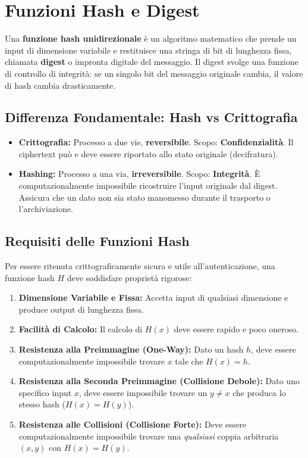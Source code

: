 \section{Funzioni Hash e Digest}
Una \textbf{funzione hash unidirezionale} è un algoritmo matematico che prende un input di dimensione variabile e restituisce una stringa di bit di lunghezza fissa, chiamata \textbf{digest} o impronta digitale del messaggio. 
Il digest svolge una funzione di controllo di integrità: se un singolo bit del messaggio originale cambia, il valore di hash cambia drasticamente.

\subsection{Differenza Fondamentale: Hash vs Crittografia}
\begin{notebox}
\begin{itemize}
    \item \textbf{Crittografia:} Processo a due vie, \textbf{reversibile}. Scopo: \textbf{Confidenzialità}. Il ciphertext può e deve essere riportato allo stato originale (decifratura).
    \item \textbf{Hashing:} Processo a una via, \textbf{irreversibile}. Scopo: \textbf{Integrità}. È computazionalmente impossibile ricostruire l'input originale dal digest. Assicura che un dato non sia stato manomesso durante il trasporto o l'archiviazione.
\end{itemize}
\end{notebox}

\subsection{Requisiti delle Funzioni Hash}
Per essere ritenuta crittograficamente sicura e utile all'autenticazione, una funzione hash $H$ deve soddisfare proprietà rigorose:
\begin{enumerate}
    \item \textbf{Dimensione Variabile e Fissa:} Accetta input di qualsiasi dimensione e produce output di lunghezza fissa.
    \item \textbf{Facilità di Calcolo:} Il calcolo di $H(x)$ deve essere rapido e poco oneroso.
    \item \textbf{Resistenza alla Preimmagine (One-Way):} Dato un hash $h$, deve essere computazionalmente impossibile trovare $x$ tale che $H(x) = h$.
    \item \textbf{Resistenza alla Seconda Preimmagine (Collisione Debole):} Dato uno specifico input $x$, deve essere impossibile trovare un $y \neq x$ che produca lo stesso hash ($H(x) = H(y)$).
    \item \textbf{Resistenza alle Collisioni (Collisione Forte):} Deve essere computazionalmente impossibile trovare una \textit{qualsiasi} coppia arbitraria $(x, y)$ con $H(x) = H(y)$.
\end{enumerate}

